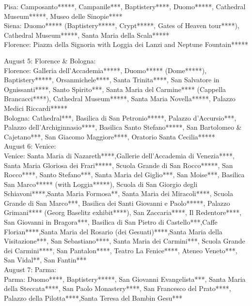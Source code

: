 Pisa: Camposanto*****, Campanile***, Baptistery****, Duomo*****, Cathedral Museum*****, Museo delle Sinopie****\\
Siena: Duomo***** (Baptistery*****, Crypt*****, Gates of Heaven tour****), Cathedral Museum*****, Santa Maria della Scala*****\\
Florence: Piazza della Signoria with Loggia dei Lanzi and Neptune Fountain*****

August 5: Florence \& Bologna:\\

Florence: Galleria dell'Accademia*****, Duomo***** (Dome*****), Baptistery*****, Orsanmichele****, Santa Trinita****, San Salvatore in Ognissanti****, Santo Spirito***, Santa Maria del Carmine**** (Cappella Brancacci****), Cathedral Museum*****, Santa Maria Novella*****,
Palazzo Medici Riccardi*****\\
Bologna: Cathedral***, Basilica di San Petronio*****, Palazzo d'Accursio***, Palazzo dell'Archiginnasio****, Basilica Santo Stefano*****, San Bartolomeo \& Cajetano***, San Giacomo Maggiore****, Oratorio Santa Cecilia*****\\

August 6: Venice:\\

Venice: Santa Maria di Nazareth****,Gallerie dell'Accademia di Venezia****, Santa Maria Gloriosa dei Frari*****, Scuola Grande di San Rocco*****, San Rocco****, Santo Stefano***, Santa Maria del Giglio***, San Moise***, Basilica San Marco***** (with Loggia*****), 
Scuola di San Giorgio degli Schiavoni****,Santa Maria Formosa**, Santa Maria dei Miracoli****, Scuola Grande di San Marco***, Basilica dei Santi Giovanni e Paolo*****, Palazzo Grimani**** (Georg Baselitz exhibit****), San Zaccaria****, Il Redentore****, San Giovanni in Bragora***, 
Basilica di San Pietro di Castello***,Caffe Florian****,Santa Maria del Rosario (dei Gesuati)****,Santa Maria della Visitazione***, San Sebastiano****, Santa Maria dei Carmini***, Scuola Grande dei Carmini****, San Pantalon****, Teatro La Fenice****, Ateneo Veneto***, San Vidal**,
 San Fantin***\\

August 7: Parma:\\

Parma: Duomo****, Baptistery*****, San Giovanni Evangelista***, Santa Maria della Steccata****, San Paolo Monastery****, San Francesco del Prato****, Palazzo della Pilotta****,Santa Teresa del Bambin Gesu***\\

